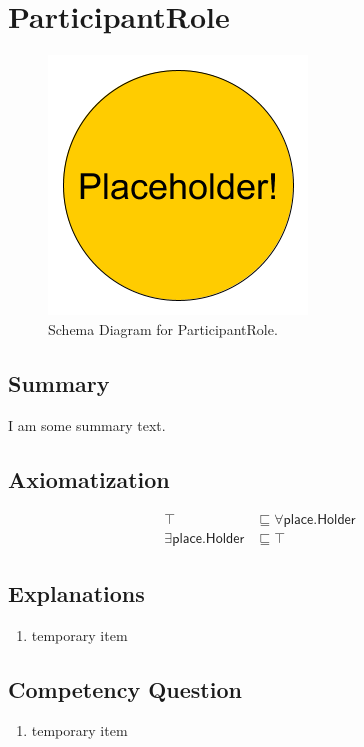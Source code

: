 \section{ParticipantRole}
\label{sec:ParticipantRole}
\begin{figure}[h!]
\begin{center}
\includegraphics[width=.4\textwidth]{figures/placeholder}
\end{center}
\caption{Schema Diagram for ParticipantRole.}
\label{fig:ParticipantRole}
\end{figure}
\subsection{Summary}
\label{sum:ParticipantRole}
I am some summary text.

\subsection{Axiomatization}
\label{axs:ParticipantRole}
\begin{align}
\top &\sqsubseteq \forall\textsf{place.Holder} \\ 
\exists\textsf{place.Holder} &\sqsubseteq \top 
\end{align}

\subsection{Explanations}
\label{exp:ParticipantRole}
\begin{enumerate}
\item temporary item
\end{enumerate}

\subsection{Competency Question}
\label{cqs:ParticipantRole}
\begin{enumerate}[CQ1.]
\item temporary item
\end{enumerate}

\newpage

